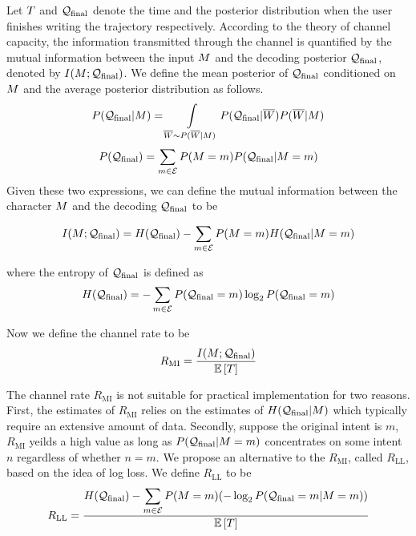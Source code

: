 \documentclass{sigchi}
\begin{document}
Let $T$ and $\mathcal{Q}_{\mathrm{final}}$ denote the time and the posterior
distribution when the user finishes writing the trajectory
respectively.  According to the theory of channel capacity, the
information transmitted through the channel is quantified by the
mutual information between the input $M$ and the decoding
posterior $\mathcal{Q}_{\mathrm{final}}$, denoted by $I(M ; \mathcal{Q}_{\mathrm{final}})$. We
define the mean posterior of $\mathcal{Q}_{\mathrm{final}}$ conditioned on $M$ and
the average posterior distribution as follows.
\[
P(\mathcal{Q}_{\mathrm{final}} | M) =
\int\limits_{\overline{W} \sim P(\overline{W} | M)} { P(\mathcal{Q}_{\mathrm{final}} | \overline{W})
P(\overline{W} | M)} 
\]
\[
P(\mathcal{Q}_{\mathrm{final}})
=
\sum_{m \in \mathcal{E}} 
P(M = m) P(\mathcal{Q}_{\mathrm{final}} | M = m)
\]
Given these two expressions, we can define the mutual information
between the character $M$ and the decoding $\mathcal{Q}_{\mathrm{final}}$ to be 
{
\small
\[
I(M ; \mathcal{Q}_{\mathrm{final}}) = 
H(\mathcal{Q}_{\mathrm{final}})
- \sum_{m \in \mathcal{E}} P(M = m) H(\mathcal{Q}_{\mathrm{final}} | M = m)
\]

}
where the entropy of $\mathcal{Q}_{\mathrm{final}}$ is defined as
\[
H(\mathcal{Q}_{\mathrm{final}}) = -\sum_{m \in \mathcal{E}} {
P(\mathcal{Q}_{\mathrm{final}} = m) \log_2 P(\mathcal{Q}_{\mathrm{final}} = m)}
\]

\newcommand{\RMI}{R_{\mathrm{MI}}}
\newcommand{\RLL}{R_{\mathrm{LL}}}

Now we define the channel rate to be 
\begin{align}
\label{eq:channel_rate}
\RMI
= 
\frac{I( \intent ;  \predFinal)}{\expectedDuration}
\end{align}

The channel rate $\RMI$ is not suitable for practical implementation
for two reasons. First, the estimates of $\RMI$ relies on the
estimates of $H(\mathcal{Q}_{\mathrm{final}} | M)$ which typically require an
extensive amount of data. Secondly, suppose the original intent is
$m$, $\RMI$ yeilds a high value as long as $P(\mathcal{Q}_{\mathrm{final}} | M =
m)$ concentrates on some intent $n$ regardless of whether $n = m$.  We
propose an alternative to the $\RMI$, called $\RLL$, based on the idea
of log loss. We define $\RLL$ to be
{ 
\scriptsize
\begin{align}
\label{eq:channel_rate_ll}
\RLL = \frac{H(\predFinal) 
 - \displaystyle\sum_{m \in \intentSet} P(\intent = m) (-\log_2 P(\predFinal = m | \intent = m))}{\expectedDuration}
\end{align}
}
\end{document}
